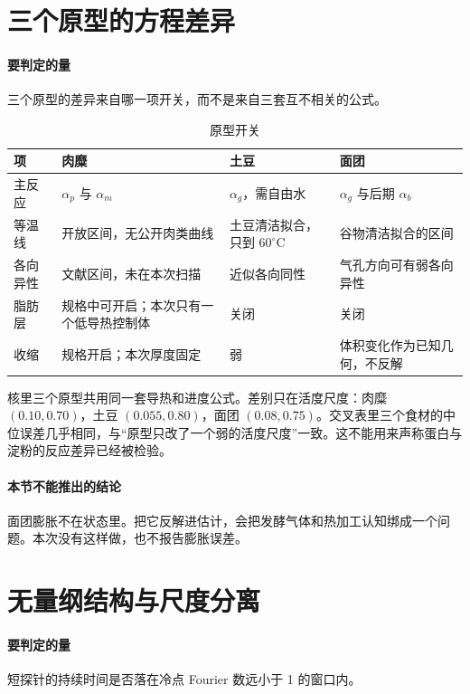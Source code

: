 \section{三个原型的方程差异}

\paragraph{要判定的量}
三个原型的差异来自哪一项开关，而不是来自三套互不相关的公式。

\begin{table}[ht]
\centering
\caption{原型开关}
\begin{tabularx}{\textwidth}{lXXX}
\toprule
项 & 肉糜 & 土豆 & 面团 \\
\midrule
主反应 & \(\alpha_p\) 与 \(\alpha_m\) & \(\alpha_g\)，需自由水 & \(\alpha_g\) 与后期 \(\alpha_b\) \\
等温线 & 开放区间，无公开肉类曲线 & 土豆清洁拟合，只到 \(60^\circ\mathrm{C}\) & 谷物清洁拟合的区间 \\
各向异性 & 文献区间，未在本次扫描 & 近似各向同性 & 气孔方向可有弱各向异性 \\
脂肪层 & 规格中可开启；本次只有一个低导热控制体 & 关闭 & 关闭 \\
收缩 & 规格开启；本次厚度固定 & 弱 & 体积变化作为已知几何，不反解 \\
\bottomrule
\end{tabularx}
\end{table}

核里三个原型共用同一套导热和进度公式。差别只在活度尺度：肉糜 \((0.10,0.70)\)，土豆 \((0.055,0.80)\)，面团 \((0.08,0.75)\)。交叉表里三个食材的中位误差几乎相同，与“原型只改了一个弱的活度尺度”一致。这不能用来声称蛋白与淀粉的反应差异已经被检验。

\paragraph{本节不能推出的结论}
面团膨胀不在状态里。把它反解进估计，会把发酵气体和热加工认知绑成一个问题。本次没有这样做，也不报告膨胀误差。

\section{无量纲结构与尺度分离}

\paragraph{要判定的量}
短探针的持续时间是否落在冷点 Fourier 数远小于 1 的窗口内。

